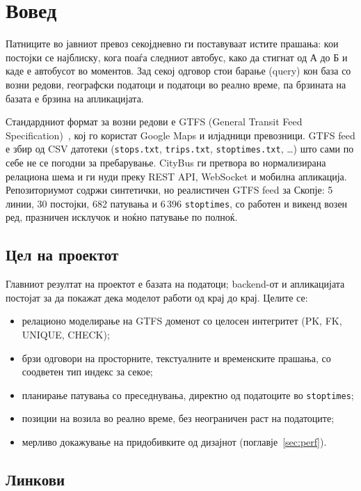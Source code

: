 \documentclass[11pt, a4paper]{article}
\renewcommand{\_}{\oldunderscore\allowbreak}
\newcommand{\code}[1]{\texttt{#1}}
\begin{document}
\section{Вовед}

Патниците во јавниот превоз секојдневно ги поставуваат истите прашања: кои постојки се најблиску, кога поаѓа следниот автобус, како да стигнат од А до Б и каде е автобусот во моментов. Зад секој одговор стои барање (query) кон база со возни редови, географски податоци и податоци во реално време, па брзината на базата е брзина на апликацијата.

Стандардниот формат за возни редови е GTFS (General Transit Feed Specification)~\cite{gtfs}, кој го користат Google Maps и илјадници превозници. GTFS feed е збир од CSV датотеки (\code{stops.txt}, \code{trips.txt}, \code{stop\_times.txt}, \ldots) што сами по себе не се погодни за пребарување. CityBus ги претвора во нормализирана релациона шема и ги нуди преку REST API, WebSocket и мобилна апликација. Репозиториумот содржи синтетички, но реалистичен GTFS feed за Скопје: 5 линии, 30 постојки, 682 патувања и 6\,396 \code{stop\_times}, со работен и викенд возен ред, празничен исклучок и ноќно патување по полноќ.

\subsection{Цел на проектот}

Главниот резултат на проектот е базата на податоци; backend-от и апликацијата постојат за да покажат дека моделот работи од крај до крај. Целите се:
\begin{itemize}
    \item релационо моделирање на GTFS доменот со целосен интегритет (PK, FK, UNIQUE, CHECK);
    \item брзи одговори на просторните, текстуалните и временските прашања, со соодветен тип индекс за секое;
    \item планирање патувања со преседнувања, директно од податоците во \code{stop\_times};
    \item позиции на возила во реално време, без неограничен раст на податоците;
    \item мерливо докажување на придобивките од дизајнот (поглавје~\ref{sec:perf}).
\end{itemize}

\subsection{Линкови}
\end{document}
